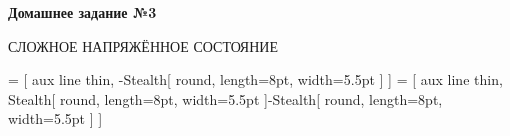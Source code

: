 \documentclass[14pt]{extarticle}
\begin{document}


\def\forcearrowscale{4}

\thispagestyle{empty} %

\begin{center}
\vspace*{\fill}

{\large \textbf{Домашнее задание №\hspace{.33ex}3}}

\vspace{1cm}

{\large \MakeUppercase{Сложное напряжённое состояние}}

\vspace{7cm}
\vspace*{\fill}
\end{center}

\newpage



 = [ aux line thin, -{Stealth[ round, length=8pt, width=5.5pt ]} ]
 = [ aux line thin, {Stealth[ round, length=8pt, width=5.5pt ]}-{Stealth[ round, length=8pt, width=5.5pt ]} ]

\newcommand\drawcirclesection{
\draw [ aux line thick, pattern=flexible hatch ]
	( 0, 0 ) circle ( \radiusofcircle ) ;
}

\def\angleofdimension{158}
\def\deltaradiusofdimension{.7}

\newcommand\drawcirclesectiondimensions{
\draw [ aux line thin, opacity=.8 ]
	( {\radiusofcircle * cos(\angleofdimension)}, {\radiusofcircle * sin(\angleofdimension)} )
	-- ( {\radiusofcircle * cos(\angleofdimension + 180)}, {\radiusofcircle * sin(\angleofdimension + 180)} ) ;
\draw [ dimension arrow ]
	( {(\radiusofcircle + \deltaradiusofdimension) * cos(\angleofdimension)}, {(\radiusofcircle + \deltaradiusofdimension) * sin(\angleofdimension)} )
	-- ( {\radiusofcircle * cos(\angleofdimension)}, {\radiusofcircle * sin(\angleofdimension)} ) ;
\draw [ dimension arrow ]
	( {(\radiusofcircle + \deltaradiusofdimension + .22) * cos(\angleofdimension + 180)}, {(\radiusofcircle + \deltaradiusofdimension + .22) * sin(\angleofdimension + 180)} )
	-- ( {\radiusofcircle * cos(\angleofdimension + 180)}, {\radiusofcircle * sin(\angleofdimension + 180)} ) ;
\draw [ aux line thin ]
	( {(\radiusofcircle + \deltaradiusofdimension + .22) * cos(\angleofdimension + 180)}, {(\radiusofcircle + \deltaradiusofdimension + .22) * sin(\angleofdimension + 180)} )
	-- ++( .74, 0 )
	node [ pos=.49, above, inner sep=0pt, outer sep=3pt ]
	{\scalebox{.8}{$ \scalebox{1.2}{\diameter} \hspace{-.3ex} D $}} ;
}
\end{document}
